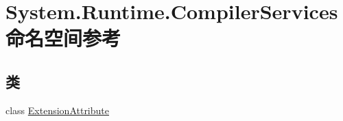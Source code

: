 \hypertarget{namespace_system_1_1_runtime_1_1_compiler_services}{}\section{System.\+Runtime.\+Compiler\+Services 命名空间参考}
\label{namespace_system_1_1_runtime_1_1_compiler_services}
\subsection*{类}
\begin{DoxyCompactItemize}
\item 
class \hyperlink{class_system_1_1_runtime_1_1_compiler_services_1_1_extension_attribute}{Extension\+Attribute}
\end{DoxyCompactItemize}
